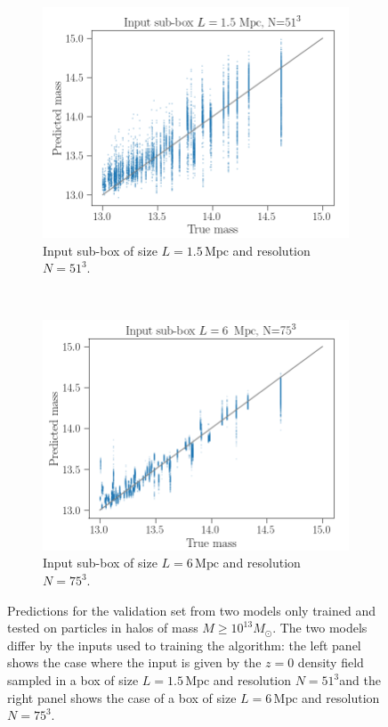 \documentclass[11pt]{article}
\begin{document}
\begin{figure}
    \centering
    \begin{subfigure}{0.5\textwidth}
        \centering
        \includegraphics[width=\textwidth]{z0/high_mass_small_subbox.png}
        \caption{Input sub-box of size $L=1.5\, \mathrm{Mpc}$ and resolution $N=51^3$.}
    \end{subfigure}%
    ~ 
    \begin{subfigure}{0.5\textwidth}
        \centering
        \includegraphics[width=\textwidth]{z0/high_mass/pred_vs_true_input_6mpc}
        \caption{Input sub-box of size $L=6\, \mathrm{Mpc}$ and resolution $N=75^3$.}
    \end{subfigure}
    \caption{Predictions for the validation set from two models only trained and tested on particles in halos of mass $M \geq 10^{13} M_{\odot}$. The two models differ by the inputs used to training the algorithm: the left panel shows the case where the input is given by the $z=0$ density field sampled in a box of size $L=1.5\, \mathrm{Mpc}$ and resolution $N=51^3$and the right panel shows the case of a box of size $L=6\, \mathrm{Mpc}$ and resolution $N=75^3$. }
    \label{fig:highmass}
\end{figure}
\end{document}
